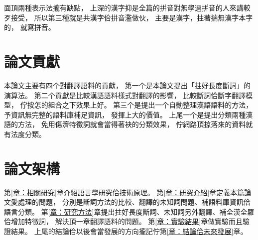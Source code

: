 面頂兩種表示法攏有缺點，
上深的漢字抑是全篇的拼音對無學過拼音的人來講較歹接受，
所以第三種就是共漢字佮拼音濫做伙，
主要是漢字，拄著揣無漢字本字的，
就寫拼音。

\section{論文貢獻}
\label{節：論文貢獻}
本論文主要有四个對翻譯語料的貢獻，
第一个是本論文提出「拄好長度斷詞」的演算法。
第二个貢獻是比較漢語語料樣式對翻譯的影響，
比較斷詞佮斷字翻譯模型，
佇按怎的組合之下效果上好。
第三个是提出一个自動整理漢語語料的方法，
予資訊無完整的語料庫補足資訊，
發揮上大的價值。
上尾一个是提出分類兩種漢語的方法，
免用傷濟特徵詞就會當得著袂的分類效果，
佇網路頂掠落來的資料就有法度分類。

\section{論文架構}
\label{節：論文架構}

第\ref{章：相關研究}章介紹語言學研究佮技術原理。
第\ref{章：研究介紹}章定義本篇論文愛處理的問題，
分別是斷詞方法的比較、翻譯的未知詞問題、補語料庫資訊佮語言分類。
第\ref{章：研究方法}章提出拄好長度斷詞、未知詞另外翻譯、補全漢全羅佮增加特徵詞，
解決頂一章翻譯語料的問題。
第\ref{章：實驗結果}章做實驗而且驗證結果。
上尾的結論佮以後會當發展的方向攏記佇第\ref{章：結論佮未來發展}章。
